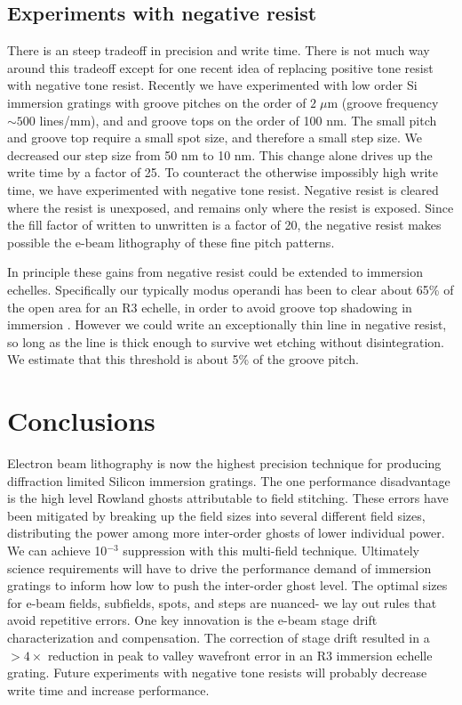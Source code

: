 \documentclass[]{spie}  %
\begin{document}
\subsection{Experiments with negative resist}
There is an steep tradeoff in precision and write time.  There is not much way around this tradeoff except for one recent idea of replacing positive tone resist with negative tone resist.  Recently we have experimented with low order Si immersion gratings with groove pitches on the order of $2 \; \mu$m (groove frequency $\sim500$ lines/mm), and and groove tops on the order of 100 nm.   The small pitch and groove top require a small spot size, and therefore a small step size.  We decreased our step size from 50 nm to 10 nm.  This change alone drives up the write time by a factor of 25.  To counteract the otherwise impossibly high write time, we have experimented with negative tone resist.  Negative resist is cleared where the resist is unexposed, and remains only where the resist is exposed.  Since the fill factor of written to unwritten is a factor of 20, the negative resist makes possible the e-beam lithography of these fine pitch patterns.  

In principle these gains from negative resist could be extended to immersion echelles.  Specifically our typically modus operandi has been to clear about 65\% of the open area for an R3 echelle, in order to avoid groove top shadowing in immersion \cite{2012SPIE.8450E..2SG}.  However we could write an exceptionally thin line in negative resist, so long as the line is thick enough to survive wet etching without disintegration.  We estimate that this threshold is about 5\% of the groove pitch.  


\section{Conclusions}
Electron beam lithography is now the highest precision technique for producing diffraction limited Silicon immersion gratings.  The one performance disadvantage is the high level Rowland ghosts attributable to field stitching.  These errors have been mitigated by breaking up the field sizes into several different field sizes, distributing the power among more inter-order ghosts of lower individual power.  We can achieve 10$^{-3}$ suppression with this multi-field technique.  Ultimately science requirements will have to drive the performance demand of immersion gratings to inform how low to push the inter-order ghost level.  The optimal sizes for e-beam fields, subfields, spots, and steps are nuanced- we lay out rules that avoid repetitive errors.  One key innovation is the e-beam stage drift characterization and compensation.  The correction of stage drift resulted in a $>4\times$ reduction in peak to valley wavefront error in an R3 immersion echelle grating.  Future experiments with negative tone resists will probably decrease write time and increase performance.
\end{document}
